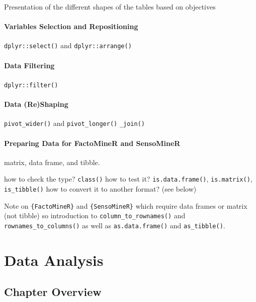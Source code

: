 \documentclass[
]{book}
\begin{document}
Presentation of the different shapes of the tables based on objectives

\hypertarget{variables-selection-and-repositioning}{%
\subsubsection{Variables Selection and Repositioning}\label{variables-selection-and-repositioning}}

\texttt{dplyr::select()} and \texttt{dplyr::arrange()}

\hypertarget{data-filtering}{%
\subsubsection{Data Filtering}\label{data-filtering}}

\texttt{dplyr::filter()}

\hypertarget{data-reshaping}{%
\subsubsection{Data (Re)Shaping}\label{data-reshaping}}

\texttt{pivot\_wider()} and \texttt{pivot\_longer()}
\texttt{\_join()}

\hypertarget{preparing-data-for-factominer-and-sensominer}{%
\subsubsection{Preparing Data for FactoMineR and SensoMineR}\label{preparing-data-for-factominer-and-sensominer}}

matrix, data frame, and tibble.

how to check the type? \texttt{class()}
how to test it? \texttt{is.data.frame()}, \texttt{is.matrix()}, \texttt{is\_tibble()}
how to convert it to another format? (see below)

Note on \texttt{\{FactoMineR\}} and \texttt{\{SensoMineR\}} which require data frames or matrix (not tibble) so introduction to \texttt{column\_to\_rownames()} and \texttt{rownames\_to\_columns()} as well as \texttt{as.data.frame()} and \texttt{as\_tibble()}.

\hypertarget{data-analysis}{%
\chapter{Data Analysis}\label{data-analysis}}

\hypertarget{chapter-overview-1}{%
\section{Chapter Overview}\label{chapter-overview-1}}
\end{document}
